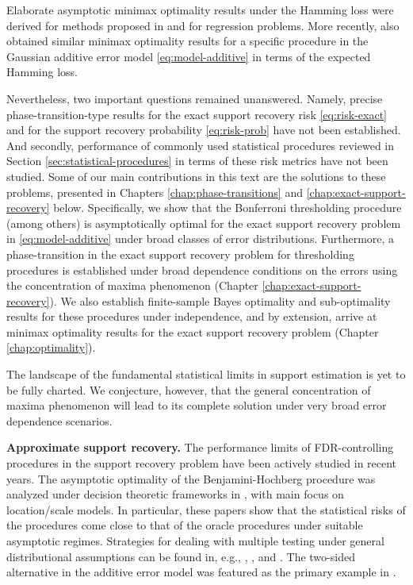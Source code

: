 Elaborate asymptotic minimax optimality results under the Hamming loss were derived for methods proposed in \cite{ji2012ups} and \cite{jin2014optimality} for regression problems.
More recently, \cite{butucea2018variable} also obtained similar minimax optimality results for a specific procedure in the Gaussian additive error model \eqref{eq:model-additive} in terms of the expected Hamming loss.

Nevertheless, two important questions remained unanswered.
Namely, precise phase-transition-type results for the exact support recovery risk 
\eqref{eq:risk-exact} and for the support recovery probability \eqref{eq:risk-prob} 
have not been established.
And secondly, performance of commonly used statistical procedures reviewed in Section \ref{sec:statistical-procedures}
in terms of these risk metrics have not been studied.
Some of our main contributions in this text are the solutions to these problems, presented in Chapters \ref{chap:phase-transitions} and \ref{chap:exact-support-recovery} below. 
Specifically, we show that the Bonferroni thresholding procedure (among others) is asymptotically optimal for the exact support recovery problem in \eqref{eq:model-additive} under broad classes of error distributions. 
Furthermore, a phase-transition in the exact support recovery problem for thresholding procedures is established under broad dependence conditions on the errors using the concentration of maxima phenomenon (Chapter \ref{chap:exact-support-recovery}). 
We also establish finite-sample Bayes optimality and sub-optimality results for these procedures under independence, and by extension, arrive at minimax optimality results for the exact support recovery problem (Chapter \ref{chap:optimality}). 

The landscape of the fundamental statistical limits in support estimation is yet to be fully charted. 
We conjecture, however, that the general concentration of maxima phenomenon will lead to its complete solution under very broad error 
dependence scenarios.
\medskip

{\bf Approximate support recovery.}
The performance limits of FDR-controlling procedures in the support recovery problem have been actively studied in recent years.
The asymptotic optimality of the Benjamini-Hochberg procedure
was analyzed under decision theoretic frameworks in \cite{genovese2002operating, bogdan2011asymptotic, neuvial2012false}, with main focus on location/scale models. 
In particular, these papers show that the statistical risks of the procedures come close to that of the oracle procedures under suitable asymptotic regimes.
Strategies for dealing with multiple testing under general distributional assumptions can be found in, e.g., \cite{efron2004large}, \cite{storey2007optimal}, and \cite{sun2007oracle}.
The two-sided alternative in the additive error model was featured as the primary example in \cite{sun2007oracle}.

